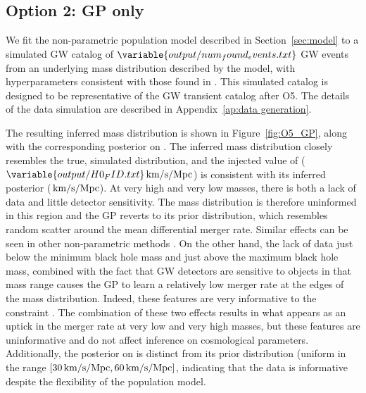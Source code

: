 \documentclass[]{aastex631}
\begin{document}
\subsection{Option 2: GP only}
We fit the non-parametric population model described in Section~\ref{sec:model} to a simulated \ac{GW} catalog of $\variable{output/num_found_events.txt}$ \ac{GW} events from an underlying mass distribution described by the \plp{} model, with hyperparameters consistent with those found in \citet{o3b_pop}.
This simulated catalog is designed to be representative of the \ac{GW}  transient catalog after \ac{O5}.
The details of the data simulation are described in Appendix~\ref{ap:data generation}.

The resulting inferred mass distribution is shown in Figure~\ref{fig:O5_GP}, along with the corresponding posterior on \Ho.
The inferred mass distribution closely resembles the true, simulated distribution, and the injected value of \Ho{} ($\variable{output/H0_FID.txt}\Hunits$) is consistent with its inferred posterior ($\,\text{km/s/Mpc}$).
At very high and very low masses, there is both a lack of data and little detector sensitivity.
The mass distribution is therefore uninformed in this region and the \ac{GP} reverts to its prior distribution, which resembles random scatter around the mean differential merger rate.
Similar effects can be seen in other non-parametric methods \citep{edelman_cover_2023, callister_parameter-free_2023}.
On the other hand, the lack of data just below the minimum black hole mass and just above the maximum black hole mass, combined with the fact that \ac{GW} detectors are sensitive to objects in that mass range causes the GP to learn a relatively low merger rate at the edges of the mass distribution.
Indeed, these features are very informative to the \Ho{} constraint \citep{the_ligo_scientific_collaboration_constraints_2021}.
The combination of these two effects results in what appears as an uptick in the merger rate at very low and very high masses, but these features are uninformative and do not affect inference on cosmological parameters.
Additionally, the posterior on \Ho{} is distinct from its prior distribution (uniform in the range $[30\,\text{km/s/Mpc},60\,\text{km/s/Mpc}]$, indicating that the data is informative despite the flexibility of the population model.
\end{document}
